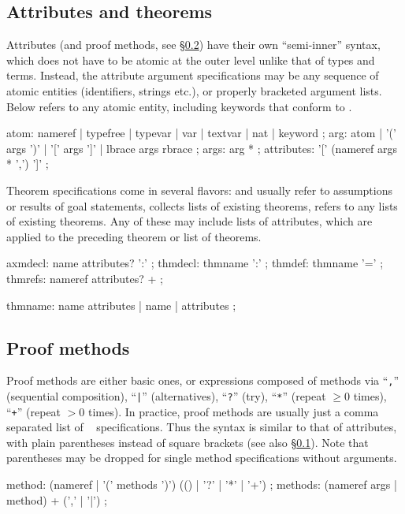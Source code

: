 \subsection{Attributes and theorems}\label{sec:syn-att}

Attributes (and proof methods, see \S\ref{sec:syn-meth}) have their own
``semi-inner'' syntax, which does not have to be atomic at the outer level
unlike that of types and terms.  Instead, the attribute argument
specifications may be any sequence of atomic entities (identifiers, strings
etc.), or properly bracketed argument lists.  Below  refers
to any atomic entity, including keywords that conform to .

\begin{rail}
  atom: nameref | typefree | typevar | var | textvar | nat | keyword
  ;
  arg: atom | '(' args ')' | '[' args ']' | lbrace args rbrace
  ;
  args: arg *
  ;
  attributes: '[' (nameref args * ',') ']'
  ;
\end{rail}

Theorem specifications come in several flavors:  and
 usually refer to assumptions or results of goal
statements,  collects lists of existing theorems,
 refers to any lists of existing theorems.  Any of these
may include lists of attributes, which are applied to the preceding theorem or
list of theorems.

\begin{rail}
  axmdecl: name attributes? ':'
  ;
  thmdecl: thmname ':'
  ;
  thmdef: thmname '='
  ;
  thmrefs: nameref attributes? +
  ;

  thmname: name attributes | name | attributes
  ;
\end{rail}


\subsection{Proof methods}\label{sec:syn-meth}

Proof methods are either basic ones, or expressions composed of methods via
``\texttt{,}'' (sequential composition), ``\texttt{|}'' (alternatives),
``\texttt{?}'' (try), ``\texttt{*}'' (repeat ${} \ge 0$ times), ``\texttt{+}''
(repeat ${} > 0$ times).  In practice, proof methods are usually just a comma
separated list of ~ specifications.
Thus the syntax is similar to that of attributes, with plain parentheses
instead of square brackets (see also \S\ref{sec:syn-att}).  Note that
parentheses may be dropped for single method specifications without arguments.

\begin{rail}
  method: (nameref | '(' methods ')') (() | '?' | '*' | '+')
  ;
  methods: (nameref args | method) + (',' | '|')
  ;
\end{rail}


